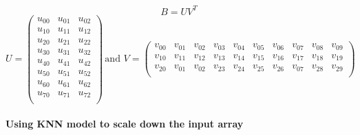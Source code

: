 \documentclass[11pt]{article}
\begin{document}
    \[B = UV^{T}\] \[
U = \left(
\begin{array}{ccc}
 u_{00} & u_{01} & u_{02}  \\
 u_{10} & u_{11} & u_{12}  \\
 u_{20} & u_{21} & u_{22}  \\
 u_{30} & u_{31} & u_{32}  \\  
 u_{40} & u_{41} & u_{42} \\  
 u_{50} & u_{51} & u_{52}  \\ 
 u_{60} & u_{61} & u_{62}  \\
 u_{70} & u_{71} & u_{72}  \\
\end{array} 
\right) \, \text{and } V = \left(
\begin{array}{cccccccccc}
 v_{00}  & v_{01} & v_{02} & v_{03} & v_{04} &v_{05} & v_{06} & v_{07} & v_{08} & v_{09} \\
 v_{10}  & v_{11} & v_{12} & v_{13} & v_{14} &v_{15} & v_{16} & v_{17} & v_{18} & v_{19} \\
 v_{20}  & v_{01} & v_{02} & v_{23} & v_{24} &v_{25} & v_{26} & v_{07} & v_{28} & v_{29} \\
\end{array}
\right)
\]

    \paragraph{Using KNN model to scale down the input
array}\label{using-knn-model-to-scale-down-the-input-array}
\end{document}
